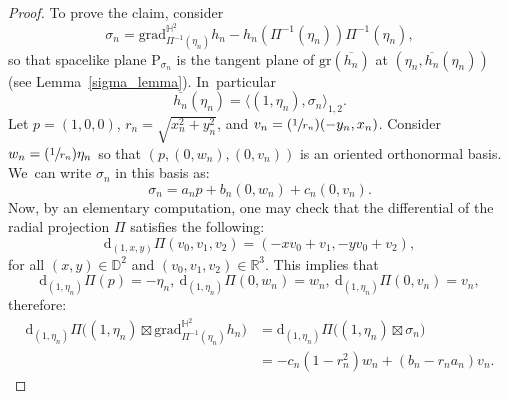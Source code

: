 \documentclass[10pt]{amsart}
\newcommand{\Psfrac}[2]{(\sfrac{#1}{#2})}
\theoremstyle{plain}
\theoremstyle{definition}
\newcommand{\grad}{\mathrm{grad}^{\mathbb{H}^2}}
\newcommand{\inner}[1] {\langle #1 \rangle}
\begin{document}
\begin{proof}
To prove the claim, consider
\[
\sigma_n=\grad_{\Pi^{-1}(\eta_n)}h_n-h_n(\Pi^{-1}(\eta_n))\Pi^{-1}(\eta_n),
\]
so that spacelike plane $\mathrm{P}_{\sigma_n}$ is the tangent plane of $\mathrm{gr}(\overline{h_n})$ at $(\eta_n,\overline{h_n}(\eta_n))$ (see Lem\-ma~\ref{sigma_lemma}). In~particular
\begin{equation}\label{u(pi2)}
\overline{h_n}(\eta_n)= \inner{(1,\eta_n),\sigma_n}_{1,2}.
\end{equation}
Let $p = (1, 0, 0)$, $r_n = \sqrt{x_n^2 + y_n^2}$, and $v_n = \Psfrac{1}{r_n}(-y_n, x_n)$. Consider $w_n = \Psfrac{1}{r_n}\eta_n$ so that $(p, (0,w_n), (0,v_n))$ is an oriented orthonormal basis. We~can write $\sigma_n$ in this basis as: \begin{equation}\label{sigma_n}
\sigma_n=a_np+b_n(0,w_n)+c_n(0,v_n).
\end{equation}
Now, by an elementary computation, one may check that the differential of the radial projection $\Pi$ satisfies the following:
\[
\mathrm{d}_{(1,x,y)}\Pi(v_0,v_1,v_2)=(-x v_0+v_1, -y v_0+v_2),
\]
for all $(x,y)\in\mathbb{D}^2$ and $(v_0,v_1,v_2)\in\mathbb{R}^3$. This implies that
\[
\mathrm{d}_{(1,\eta_n)}\Pi(p) = -\eta_n,\ \mathrm{d}_{(1,\eta_n)}\Pi(0,w_n) = w_n, \ \mathrm{d}_{(1,\eta_n)}\Pi(0,v_n) = v_n,
\]
therefore:
\begin{equation}\label{pullback_of_vector_field2}
\begin{aligned}
\mathrm{d}_{(1,\eta_n)}\Pi\!\bigl((1,\eta_n)\boxtimes
\grad_{\Pi^{-1}(\eta_n)} h_n\bigr)
&= \mathrm{d}_{(1,\eta_n)}\Pi\!\bigl((1,\eta_n)\boxtimes\sigma_n\bigr) \\
&= -c_n(1-r_n^2)w_n + (b_n-r_na_n)v_n.
\end{aligned}
\end{equation}


\end{proof}
\end{document}
